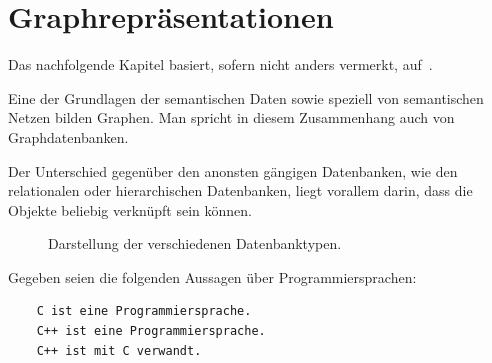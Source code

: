 \chapter{Graphrepräsentationen}
\label{chap:graph_data}

Das nachfolgende Kapitel basiert, sofern nicht anders vermerkt, auf~\cite{linkeddatatools}.

Eine der Grundlagen der semantischen Daten sowie speziell von semantischen Netzen bilden Graphen. Man spricht in diesem Zusammenhang auch von Graphdatenbanken.

Der Unterschied gegenüber den anonsten gängigen Datenbanken, wie den relationalen oder hierarchischen Datenbanken, liegt vorallem darin, dass die Objekte beliebig verknüpft sein können.

\begin{figure}[htbp]
\centering {}
\caption{Darstellung der verschiedenen Datenbanktypen.\label{fig:datenbanktypen}\protect\footnotemark}
\end{figure}

\newpage

Gegeben seien die folgenden Aussagen über Programmiersprachen:
\lstset{}
\begin{lstlisting}
    C ist eine Programmiersprache.
    C++ ist eine Programmiersprache.
    C++ ist mit C verwandt.
\end{lstlisting}

